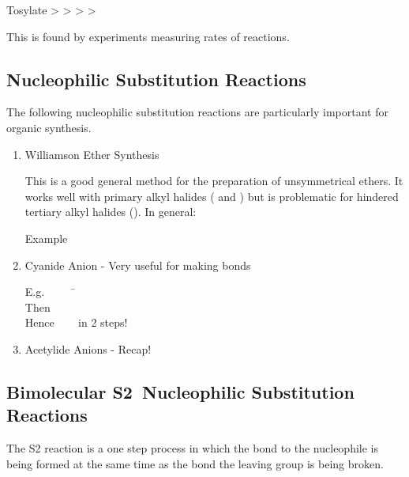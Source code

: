 \begin{center}
  Tosylate >  >  >  > 
\end{center}

This is found by experiments measuring rates of reactions.

\subsection{Nucleophilic Substitution Reactions}

The following nucleophilic substitution reactions are particularly important
for organic synthesis.

\begin{enumerate}[label=\alph*)]

  \item Williamson Ether Synthesis

    This is a good general method for the preparation of unsymmetrical ethers.
    It works well with primary alkyl halides ( and ) but
    is problematic for hindered tertiary alkyl halides (). In general:


    Example


  \item Cyanide Anion - Very useful for making  bonds

    \begin{tabbing}
      E.g.~~~~~ \=  \\
      Then \>  \\
      Hence \>  ~~~ in 2 steps!
    \end{tabbing}

  \item Acetylide Anions - Recap!

\end{enumerate}

\subsection{Bimolecular \texorpdfstring{S2}\ \ Nucleophilic Substitution Reactions}

The S2 reaction is a one step process in which the bond to the nucleophile
is being formed at the same time as the bond the leaving group is being broken.

